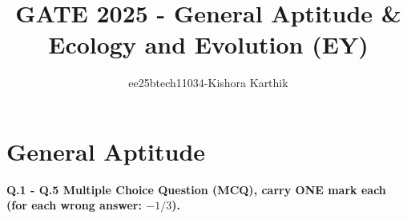 \documentclass[journal]{IEEEtran}
\begin{document}
\vspace{3cm}


\title{GATE 2025 - General Aptitude \& Ecology and Evolution (EY)}
\author{ee25btech11034-Kishora Karthik}
\maketitle

{\let\newpage\relax\maketitle}

\renewcommand{\thefigure}{\theenumi}
\renewcommand{\thetable}{\theenumi}
\setlength{\intextsep}{10pt} 

\section*{\textbf{General Aptitude}}
\textbf{Q.1 - Q.5 Multiple Choice Question (MCQ), carry ONE mark each (for each wrong answer: $-1/3$).}
 
\end{document}
